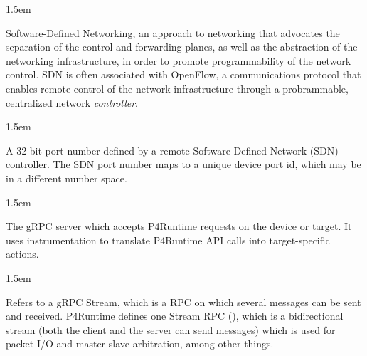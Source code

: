 \documentclass[11pt]{article}
\begin{document}
{\begin{mddefinitions}
\begin{mdbmarginx}{}{}{}{1.5em}%
\begin{mddefdata}%
Software-Defined Networking, an approach to networking that advocates the
separation of the control and forwarding planes, as well as the abstraction
of the networking infrastructure, in order to promote programmability of the
network control. SDN is often associated with OpenFlow, a communications
protocol that enables remote control of the network infrastructure through a
probrammable, centralized network \emph{controller}.
\end{mddefdata}%
\end{mdbmarginx}%


\begin{mdbmarginx}{}{}{}{1.5em}%
\begin{mddefdata}%
A 32-bit port number defined by a remote Software-Defined Network (SDN)
controller. The SDN port number maps to a unique device port id, which may
be in a different number space.
\end{mddefdata}%
\end{mdbmarginx}%


\begin{mdbmarginx}{}{}{}{1.5em}%
\begin{mddefdata}%
The gRPC server which accepts P4Runtime requests on the device or target. It
uses instrumentation to translate P4Runtime API calls into target-specific
actions.
\end{mddefdata}%
\end{mdbmarginx}%


\begin{mdbmarginx}{}{}{}{1.5em}%
\begin{mddefdata}%
Refers to a gRPC Stream, which is a RPC on which several messages can be
sent and received. P4Runtime defines one Stream RPC (), which
is a bidirectional stream (both the client and the server can send messages)
which is used for packet I/O and master-slave arbitration, among other
things.
\end{mddefdata}%
\end{mdbmarginx}%


\end{mddefinitions}}
\end{document}
